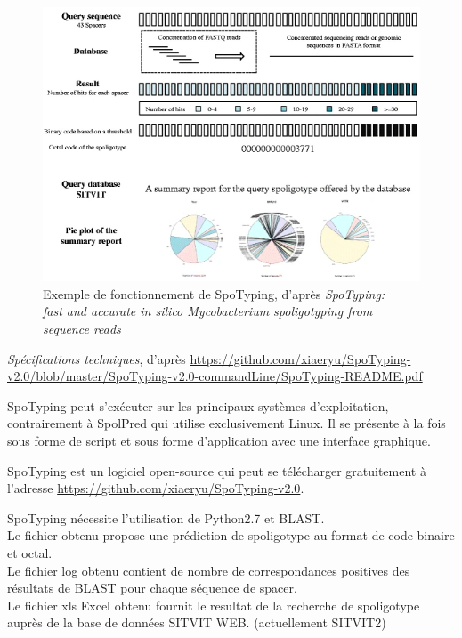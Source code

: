 \documentclass[twoside,a4paper,11pt,frenchb,openany]{report}
\begin{document}
\begin{figure}
\includegraphics[scale=0.6]{spotyping.png}
\caption{Exemple de fonctionnement de SpoTyping, d'après \textit{SpoTyping:\\ fast and accurate in silico Mycobacterium spoligotyping from sequence reads}}
\end{figure}

\textit{Spécifications techniques}, d'après \url{https://github.com/xiaeryu/SpoTyping-v2.0/blob/master/SpoTyping-v2.0-commandLine/SpoTyping-README.pdf}

SpoTyping peut s'exécuter sur les principaux systèmes d'exploitation, contrairement à SpolPred qui utilise exclusivement Linux. Il se présente à la fois sous forme de script et sous forme d'application avec une interface graphique.

SpoTyping est un logiciel open-source qui peut se télécharger gratuitement à l'adresse \url{https://github.com/xiaeryu/SpoTyping-v2.0}.

SpoTyping nécessite l'utilisation de Python2.7 et BLAST.\\
Le fichier obtenu propose une prédiction de spoligotype au format de code binaire et octal.\\
Le fichier log obtenu contient de nombre de correspondances positives des résultats de BLAST pour chaque séquence de spacer.\\
Le fichier xls Excel obtenu fournit le resultat de la recherche de spoligotype auprès de la base de données SITVIT WEB. (actuellement SITVIT2)
\end{document}
